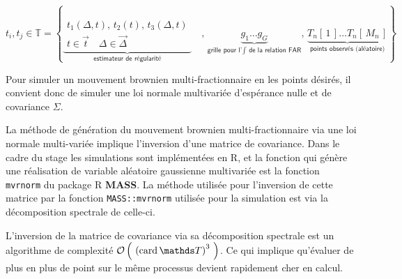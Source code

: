 \begin{equation*}
	t_i, t_j \in
	\mathds T = \left\{
	\underbrace{
		\begin{array}{c}
			t_1(\Delta, t), \, t_2(t), \, t_3(\Delta, t )
			\\
			t \in \vec t \quad \Delta \in \overrightarrow \Delta
		\end{array}
	}_{
	\textsf{estimateur de régularité}
	}
	\quad , \,
	\underbrace{
		g_1 \dots g_G
	}_{
	\textsf{grille pour l'} \int \textsf{ de la relation FAR}
	}
	, \,
	\underbrace{
	T_n[\,1\,] \dots T_n[\,M_n\,]
	}_{
	\textsf{points observés (aléatoire)}
	}
	\right\}
\end{equation*}

Pour simuler un mouvement brownien multi-fractionnaire en les points désirés, il convient donc de simuler une loi normale multivariée d'espérance nulle et de covariance $\Sigma$.

\begin{rem}
	La méthode de génération du mouvement brownien multi-fractionnaire via une loi normale multi-variée implique l'inversion d'une matrice de covariance. Dans le cadre du stage les simulations sont implémentées en R, et la fonction qui génère une réalisation de variable aléatoire gaussienne multivariée est la fonction \texttt{mvrnorm} du package R \textbf{MASS}. La méthode utilisée pour l'inversion de cette matrice par la fonction \texttt{MASS::mvrnorm} utilisée pour la simulation est via la décomposition spectrale de celle-ci.

	L'inversion de la matrice de covariance via sa décomposition spectrale est un algorithme de complexité $\grando{{(\operatorname{card}\mathds T)}^3}$. Ce qui implique qu'évaluer de plus en plus de point sur le même processus devient rapidement cher en calcul.
	\label{rem:inversion_matrice_covariance_mfbm_informel}
\end{rem}
